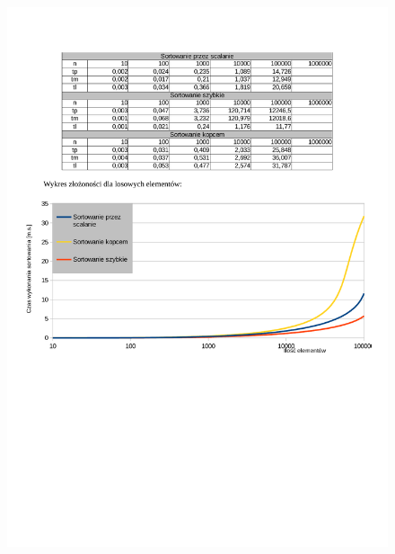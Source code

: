 \documentclass{article}
\begin{document}
\begin{figure}[H]
\includegraphics[width=\textwidth]{sort_czas1.pdf}
\label{fig:sort_czas1.pdf}
\end{figure}
\end{document}
